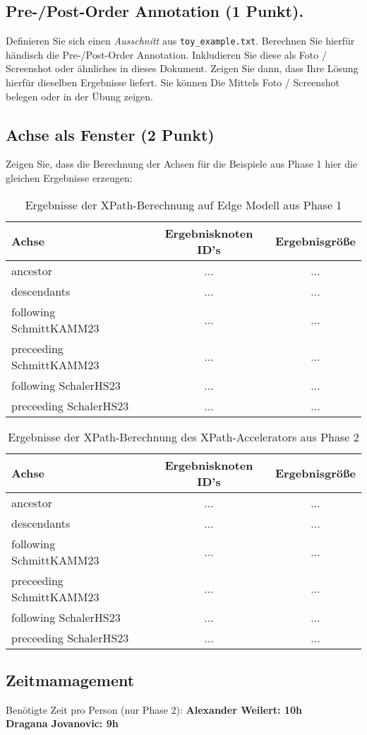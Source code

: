 \documentclass[11pt]{scrartcl}
\begin{document}
\subsection*{Pre-/Post-Order Annotation (1 Punkt).}
Definieren Sie sich einen \textit{Ausschnitt} aus \texttt{toy\_example.txt}.
Berechnen Sie hierfür händisch die Pre-/Post-Order Annotation.
Inkludieren Sie diese als Foto / Screenshot oder ähnliches in dieses Dokument.
Zeigen Sie dann, dass Ihre Lösung hierfür dieselben Ergebnisse liefert.
Sie können Die Mittels Foto / Screenshot belegen oder in der Übung zeigen.

\subsection*{Achse als Fenster (2 Punkt)}
Zeigen Sie, dass die Berechnung der Achsen für die Beispiele aus Phase 1 hier die gleichen Ergebnisse erzeugen:

\begin{table}[h]
	\centering
		\begin{center}
			\begin{tabular}{ l | c c }
				\toprule
				Achse & Ergebnisknoten ID's & Ergebnisgröße\\
				\midrule
				ancestor & ... & ... \\ 
				descendants & ... & ... \\  
				following SchmittKAMM23& ... & ... \\  
				preceeding SchmittKAMM23 & ... & ... \\ 
				following SchalerHS23& ... & ... \\  
				preceeding SchalerHS23& ... & ... \\ 
				\bottomrule
			\end{tabular}
			\end{center}
	\caption{Ergebnisse der XPath-Berechnung auf Edge Modell aus Phase 1}
	\label{tab:ErgebnisseDerXPathBerechnug}
\end{table}

\begin{table}[h]
	\centering
		\begin{center}
			\begin{tabular}{ l | c c }
				\toprule
				Achse & Ergebnisknoten ID's & Ergebnisgröße\\
				\midrule
				ancestor & ... & ... \\ 
				descendants & ... & ... \\  
				following SchmittKAMM23& ... & ... \\  
				preceeding SchmittKAMM23 & ... & ... \\ 
				following SchalerHS23& ... & ... \\  
				preceeding SchalerHS23& ... & ... \\ 
				\bottomrule
			\end{tabular}
			\end{center}
	\caption{Ergebnisse der XPath-Berechnung des XPath-Accelerators aus Phase 2}
	\label{tab:ErgebnisseDerXPathBerechnug1}
\end{table}

\subsection*{Zeitmamagement}

Benötigte Zeit pro Person (nur Phase 2):
\textbf{Alexander Weilert: 10h} \\
\textbf{Dragana Jovanovic: 9h}
\end{document}
